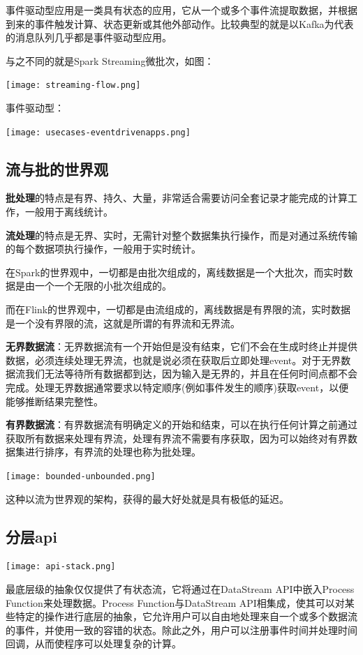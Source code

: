 \documentclass[oneside]{ctexbook}
\begin{document}
事件驱动型应用是一类具有状态的应用，它从一个或多个事件流提取数据，并根据到来的事件触发计算、状态更新或其他外部动作。比较典型的就是以Kafka为代表的消息队列几乎都是事件驱动型应用。

与之不同的就是Spark Streaming微批次，如图：

\noindent \texttt{[image: streaming-flow.png]}

事件驱动型：

\noindent \texttt{[image: usecases-eventdrivenapps.png]}

\subsection{流与批的世界观}

\textbf{批处理}的特点是有界、持久、大量，非常适合需要访问全套记录才能完成的计算工作，一般用于离线统计。

\textbf{流处理}的特点是无界、实时，无需针对整个数据集执行操作，而是对通过系统传输的每个数据项执行操作，一般用于实时统计。

在Spark的世界观中，一切都是由批次组成的，离线数据是一个大批次，而实时数据是由一个一个无限的小批次组成的。

而在Flink的世界观中，一切都是由流组成的，离线数据是有界限的流，实时数据是一个没有界限的流，这就是所谓的有界流和无界流。

\textbf{无界数据流}：无界数据流有一个开始但是没有结束，它们不会在生成时终止并提供数据，必须连续处理无界流，也就是说必须在获取后立即处理event。对于无界数据流我们无法等待所有数据都到达，因为输入是无界的，并且在任何时间点都不会完成。处理无界数据通常要求以特定顺序(例如事件发生的顺序)获取event，以便能够推断结果完整性。

\textbf{有界数据流}：有界数据流有明确定义的开始和结束，可以在执行任何计算之前通过获取所有数据来处理有界流，处理有界流不需要有序获取，因为可以始终对有界数据集进行排序，有界流的处理也称为批处理。

\noindent \texttt{[image: bounded-unbounded.png]}

这种以流为世界观的架构，获得的最大好处就是具有极低的延迟。

\subsection{分层api}

\noindent \texttt{[image: api-stack.png]}

最底层级的抽象仅仅提供了有状态流，它将通过在DataStream API中嵌入Process Function来处理数据。Process Function与DataStream API相集成，使其可以对某些特定的操作进行底层的抽象，它允许用户可以自由地处理来自一个或多个数据流的事件，并使用一致的容错的状态。除此之外，用户可以注册事件时间并处理时间回调，从而使程序可以处理复杂的计算。
\end{document}

